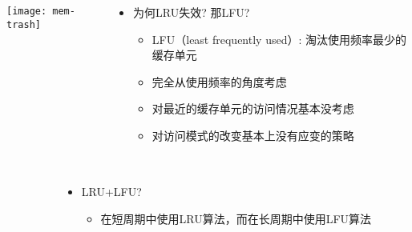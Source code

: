 \begin{frame}[plain]
	\frametitle{ }
	\begin{columns}
		\begin{column}{.5\textwidth}
			\centering
			\texttt{[image: mem-trash]}
		\end{column}
		
		\begin{column}{.5\textwidth}
			
			\begin{itemize}
				\item 为何LRU失效? 那LFU?
				\begin{itemize}
					
					\item   LFU（least frequently used）: 淘汰使用频率最少的缓存单元
					
					\item 完全从使用频率的角度考虑
					\item 对最近的缓存单元的访问情况基本没考虑
					\item 对访问模式的改变基本上没有应变的策略

				\end{itemize}
			\end{itemize}
			
			
		\end{column}
		
		
	\end{columns}
\end{frame}

\begin{frame}[plain]
	\frametitle{ }
	\begin{columns}
		\begin{column}{.1\textwidth}
			\centering
		\end{column}
		
		\begin{column}{1.0\textwidth}
			
			\begin{itemize}
				\item LRU+LFU?
				\begin{itemize}
					
					\item   在短周期中使用LRU算法，而在长周期中使用LFU算法
					
					
				\end{itemize}
			\end{itemize}
			
			
		\end{column}
		
		
	\end{columns}
\end{frame}

